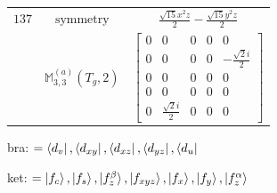 \documentclass[fleqn,8pt,landscape]{jsarticle}
\begin{document}
\begin{longtable}{ccc}
$ 137 $ & $ \text{symmetry} $ & $ \frac{\sqrt{15} x^{2} z}{2} - \frac{\sqrt{15} y^{2} z}{2} $ \\
$  $ & $ \mathbb{M}_{3,3}^{(a)}(T_{g},2) $ & $ \begin{bmatrix} 0 & 0 & 0 & 0 & 0 \\ 0 & 0 & 0 & 0 & - \frac{\sqrt{2} i}{2} \\ 0 & 0 & 0 & 0 & 0 \\ 0 & 0 & 0 & 0 & 0 \\ 0 & \frac{\sqrt{2} i}{2} & 0 & 0 & 0 \end{bmatrix} $ \\ \hline
\end{longtable}
bra: $=\bra{d_{v}}, \bra{d_{xy}}, \bra{d_{xz}}, \bra{d_{yz}}, \bra{d_{u}}$

\noindent
ket: $=\ket{f_{c}}, \ket{f_{s}}, \ket{f_{z}^{\beta}}, \ket{f_{xyz}}, \ket{f_{x}}, \ket{f_{y}}, \ket{f_{z}^{\alpha}}$
\renewcommand{\arraystretch}{1.6}
\end{document}
